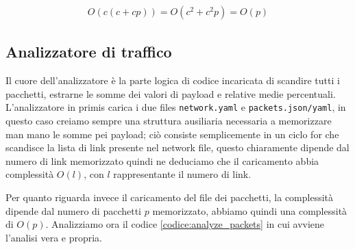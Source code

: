 \documentclass[binding=0.6cm]{sapthesis}
\begin{document}
\begin{align}
    O(c(c+cp)) = O(c^2 + c^2p) = O(p)
    \label{eq:complexity_traffic_generator}
\end{align}



\subsection{Analizzatore di traffico}
Il cuore dell'analizzatore è la parte logica di codice incaricata di scandire tutti i pacchetti, 
estrarne le somme dei valori di payload e relative medie percentuali.
L'analizzatore in primis carica i due files \texttt{network.yaml} e \texttt{packets.json/yaml}, 
in questo caso creiamo sempre una struttura ausiliaria necessaria a memorizzare man mano le somme pei payload; ciò 
consiste semplicemente in un ciclo for che scandisce la lista di link presente nel network file, questo chiaramente dipende dal numero di link
memorizzato quindi ne deduciamo che il caricamento abbia complessità \(O(l)\), con \(l\) rappresentante il numero di link.

Per quanto riguarda invece il caricamento del file dei pacchetti, la complessità dipende dal numero di pacchetti \(p\) memorizzato, abbiamo
quindi una complessità di \(O(p)\).
Analizziamo ora il codice \ref{codice:analyze_packets} in cui avviene l'analisi vera e propria.
\end{document}
